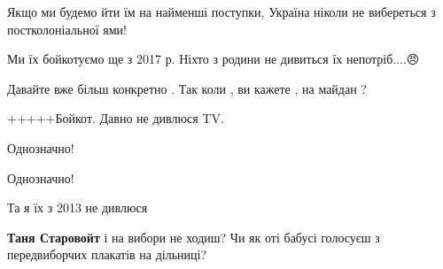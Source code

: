 \begin{itemize}
Якщо ми будемо йти їм на найменші поступки, Україна ніколи не вибереться
з постколоніальної ями!

 
Ми їх бойкотуємо ще з 2017 р. Ніхто з родини не дивиться їх непотріб....😠

 
Давайте вже більш конкретно .
Так коли , ви кажете , на майдан ?

 
+++++Бойкот. Давно не дивлюся TV.

 
Однозначно!

 
Однозначно!

 
Та я їх з 2013 не дивлюся

\begin{itemize}
 
\textbf{Таня Старовойт} і на вибори не ходиш? Чи як оті бабусі голосуєш з передвиборчих плакатів на дільниці?


\end{itemize}
\end{itemize}
